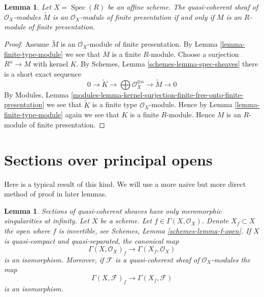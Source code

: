 \documentclass{stacks-project}
\newenvironment{slogan}{\comment}{\endcomment}
\theoremstyle{plain}
\newtheorem{lemma}[subsection]{Lemma}
\theoremstyle{definition}
\theoremstyle{remark}
\numberwithin{equation}{subsection}
\def\Spec{\mathop{\mathrm{Spec}}}
\begin{document}
\begin{lemma}
\label{lemma-finite-presentation-module}
Let $X = \Spec(R)$ be an affine scheme. The quasi-coherent sheaf
of $\mathcal{O}_X$-modules $\widetilde M$ is an $\mathcal{O}_X$-module of
finite presentation if and only if $M$ is an $R$-module of finite presentation.
\end{lemma}

\begin{proof}
Assume $\widetilde M$ is an $\mathcal{O}_X$-module of finite presentation.
By Lemma \ref{lemma-finite-type-module} we see that $M$ is a finite $R$-module.
Choose a surjection $R^n \to M$ with kernel $K$. By
Schemes, Lemma \ref{schemes-lemma-spec-sheaves}
there is a short exact sequence
$$
0 \to \widetilde{K} \to
\bigoplus \mathcal{O}_X^{\oplus n} \to
\widetilde{M} \to 0
$$
By
Modules, Lemma
\ref{modules-lemma-kernel-surjection-finite-free-onto-finite-presentation}
we see that $\widetilde{K}$ is a finite type $\mathcal{O}_X$-module.
Hence by Lemma \ref{lemma-finite-type-module}
again we see that $K$ is a finite $R$-module.
Hence $M$ is an $R$-module of finite presentation.
\end{proof}







\section{Sections over principal opens}
\label{section-principal-opens}

\noindent
Here is a typical result of this kind. We will use a more naive but
more direct method of proof in later lemmas.

\begin{lemma}
\label{lemma-invert-f-sections}
\begin{slogan}
Sections of quasi-coherent sheaves have only meromorphic singularities
at infinity.
\end{slogan}
Let $X$ be a scheme. Let $f \in \Gamma(X, \mathcal{O}_X)$.
Denote $X_f \subset X$ the open where $f$ is invertible, see
Schemes, Lemma \ref{schemes-lemma-f-open}.
If $X$ is quasi-compact and quasi-separated, the canonical map
$$
\Gamma(X, \mathcal{O}_X)_f \longrightarrow \Gamma(X_f, \mathcal{O}_X)
$$
is an isomorphism. Moreover, if $\mathcal{F}$ is a quasi-coherent
sheaf of $\mathcal{O}_X$-modules the map
$$
\Gamma(X, \mathcal{F})_f \longrightarrow \Gamma(X_f, \mathcal{F})
$$
is an isomorphism.
\end{lemma}
\end{document}
